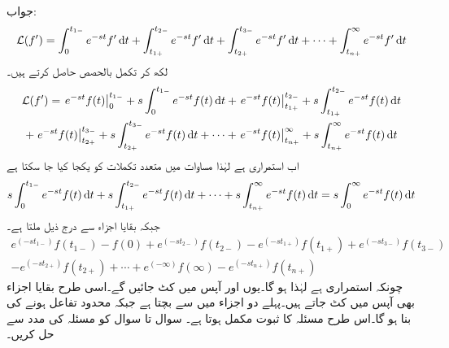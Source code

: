 جواب:
\begin{multline*}
\Laplace(f')=\int_{0}^{t_{1-}}e^{-st} f' \dif t+\int_{t_{1+}}^{t_{2-}}e^{-st} f' \dif t+\int_{t_{2+}}^{t_{3-}}e^{-st} f' \dif t+\cdots+\int_{t_{n+}}^{\infty}e^{-st} f' \dif t
\end{multline*}
لکھ کر تکمل بالحصص حاصل کرتے ہیں۔
\begin{multline}\label{مساوات_سوال_مسئلہ_ایک_درجی}
\Laplace(f')=\left. e^{-st}f(t)\right|_{0}^{t_{1-}}+s\int_{0}^{t_{1-}}e^{-st}f(t)\dif t+\left. e^{-st}f(t)\right|_{t_{1+}}^{t_{2-}}+s\int_{t_{1+}}^{t_{2-}}e^{-st}f(t)\dif t\\
+\left. e^{-st}f(t)\right|_{t_{2+}}^{t_{3-}}+s\int_{t_{2+}}^{t_{3-}}e^{-st}f(t)\dif t+\cdots+\left. e^{-st}f(t)\right|_{t_{n+}}^{\infty}+s\int_{t_{n+}}^{\infty}e^{-st}f(t)\dif t
\end{multline}
اب  استمراری ہے لہٰذا مساوات  میں متعدد تکملات کو یکجا کیا جا سکتا ہے
\begin{align*}
s\int_{0}^{t_{1-}}e^{-st}f(t)\dif t+s\int_{t_{1+}}^{t_{2-}}e^{-st}f(t)\dif t+\cdots +s\int_{t_{n+}}^{\infty}e^{-st}f(t)\dif t=s\int_{0}^{\infty}e^{-st}f(t)\dif t
\end{align*}
جبکہ بقایا اجزاء سے درج ذیل ملتا ہے۔
\begin{multline*}
e^{(-st_{1-})}f(t_{1-})-f(0)+e^{(-st_{2-})}f(t_{2-})-e^{(-st_{1+})}f(t_{1+})+e^{(-st_{3-})}f(t_{3-})\\
-e^{(-st_{2+})}f(t_{2+})+\cdots+e^{(-\infty)}f(\infty)-e^{(-st_{n+})}f(t_{n+})
\end{multline*}
چونکہ  استمراری ہے لہٰذا   ہو گا۔یوں  اور  آپس میں کٹ جائیں گے۔اسی طرح بقایا اجزاء بھی آپس میں کٹ جاتے ہیں۔پہلے دو اجزاء میں سے  بچتا ہے جبکہ   محدود تفاعل ہونے کی بنا  ہو گا۔اس طرح مسئلہ  کا ثبوت مکمل ہوتا ہے۔
سوال  تا سوال  کو مسئلہ  کی مدد سے حل کریں۔

